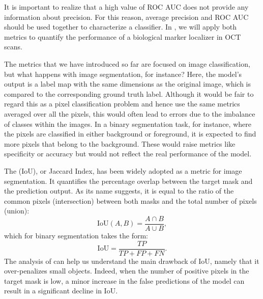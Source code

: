 It is important to realize that a high value of ROC AUC does not provide any information about precision. For this reason, average precision and ROC AUC should be used together to characterize a classifier. In , we will apply both metrics to quantify the performance of a biological marker localizer in OCT scans.

The metrics that we have introduced so far are focused on image classification, but what happens with image segmentation, for instance? Here, the model's output is a label map with the same dimensions as the original image, which is compared to the corresponding ground truth label. Although it would be fair to regard this as a pixel classification problem and hence use the same metrics averaged over all the pixels, this would often lead to errors due to the imbalance of classes within the images. In a binary segmentation task, for instance, where the pixels are classified in either background or foreground, it is expected to find more pixels that belong to the background. These would raise metrics like specificity or accuracy but would not reflect the real performance of the model.

The \textit{} (IoU), or Jaccard Index, has been widely adopted as a metric for image segmentation. It quantifies the percentage overlap between the target mask and the prediction output. As its name suggests, it is equal to the ratio of the common pixels (intersection) between both masks and the total number of pixels (union):
\begin{equation*}
    \text{IoU}(A,B) = \dfrac{A\cap B}{A \cup B},
\end{equation*}
which for binary segmentation takes the form:
\begin{equation}
    \text{IoU} = \dfrac{TP}{TP + FP + FN}.
    \label{eq:iou}
\end{equation}
The analysis of  can help us understand the main drawback of IoU, namely that it over-penalizes small objects. Indeed, when the number of positive pixels in the target mask is low, a minor increase in the false predictions of the model can result in a significant decline in IoU.
 
